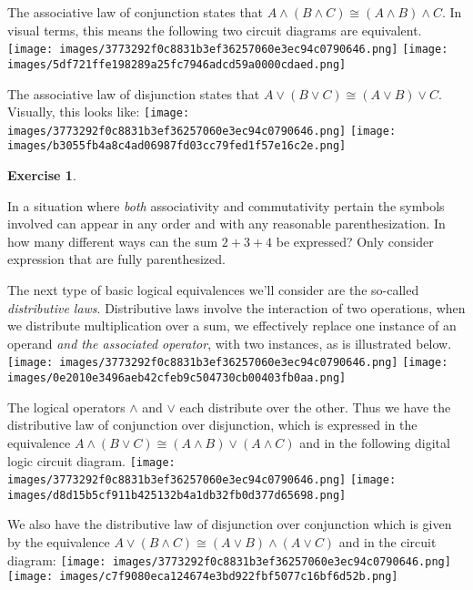 \documentclass[10pt,]{book}
\theoremstyle{plain}
\theoremstyle{definition}
\theoremstyle{definition}
\newtheorem{exercise}[theorem]{Exercise}
\numberwithin{equation}{section}
\begin{document}
    The associative law of conjunction states that \(A \land (B \land C) \cong
    (A \land B) \land C\). In visual terms, this means the following two
    circuit diagrams are equivalent.
\texttt{[image: images/3773292f0c8831b3ef36257060e3ec94c0790646.png]}
\texttt{[image: images/5df721ffe198289a25fc7946adcd59a0000cdaed.png]}
\par

    The associative law of disjunction states that \(A \lor (B \lor C) \cong
    (A \lor B) \lor C\). Visually, this looks like:
\texttt{[image: images/3773292f0c8831b3ef36257060e3ec94c0790646.png]}
\texttt{[image: images/b3055fb4a8c4ad06987fd03cc79fed1f57e16c2e.png]}
\begin{exercise}\label{exercise-10}

        In a situation where \emph{both} associativity and commutativity pertain
        the symbols involved can appear in any order and with any reasonable
        parenthesization. In how many different ways can the sum \(2+3+4\)
        be expressed? Only consider expression that are fully parenthesized.
\end{exercise}
\par

    The next type of basic logical equivalences we'll consider are the
    so-called \emph{distributive laws}.
    Distributive laws involve the
    interaction of two operations, when we distribute multiplication
    over a sum, we effectively replace one instance of an operand \emph{and the associated operator}, with two instances, as is illustrated
    below.
\texttt{[image: images/3773292f0c8831b3ef36257060e3ec94c0790646.png]}
\texttt{[image: images/0e2010e3496aeb42cfeb9c504730cb00403fb0aa.png]}
\par

    The logical operators \(\land\) and \(\lor\) each distribute over the other.
    Thus we have the distributive law of conjunction over disjunction, which
    is expressed in the equivalence
    \(A \land (B \lor C) \cong (A \land B) \lor (A \land C)\)
    and in the following digital logic circuit diagram.
\texttt{[image: images/3773292f0c8831b3ef36257060e3ec94c0790646.png]}
\texttt{[image: images/d8d15b5cf911b425132b4a1db32fb0d377d65698.png]}
\par

    We also have the distributive law of disjunction over conjunction
    which is given by the equivalence
    \(A \lor (B \land C) \cong (A \lor B) \land (A \lor C)\) and in the
    circuit diagram:
\texttt{[image: images/3773292f0c8831b3ef36257060e3ec94c0790646.png]}
\texttt{[image: images/c7f9080eca124674e3bd922fbf5077c16bf6d52b.png]}
\par
\end{document}
